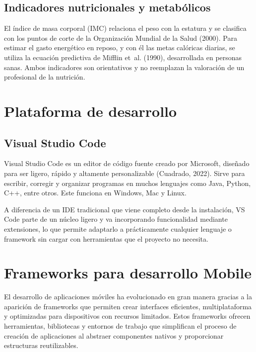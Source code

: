 \subsection{Indicadores nutricionales y metabólicos}
\label{subsec:nutricion}

El índice de masa corporal (IMC) relaciona el peso con la estatura y se clasifica
con los puntos de corte de la Organización Mundial de la Salud (2000). Para
estimar el gasto energético en reposo, y con él las metas calóricas diarias, se
utiliza la ecuación predictiva de Mifflin et~al. (1990), desarrollada en
personas sanas. Ambos indicadores son orientativos y no reemplazan la
valoración de un profesional de la nutrición.

\section{Plataforma de desarrollo}
\label{sec:plataforma}

\subsection{Visual Studio Code}

Visual Studio Code es un editor de código fuente creado por Microsoft,
diseñado para ser ligero, rápido y altamente personalizable (Cuadrado, 2022).
Sirve para escribir, corregir y organizar programas en muchos lenguajes como
Java, Python, C++, entre otros. Este funciona en Windows, Mac y Linux.

A diferencia de un IDE tradicional que viene completo desde la instalación, VS
Code parte de un núcleo ligero y va incorporando funcionalidad mediante
extensiones, lo que permite adaptarlo a prácticamente cualquier lenguaje o
framework sin cargar con herramientas que el proyecto no necesita.

\section{Frameworks para desarrollo Mobile}
\label{sec:frameworks}

El desarrollo de aplicaciones móviles ha evolucionado en gran manera gracias a
la aparición de frameworks que permiten crear interfaces eficientes,
multiplataforma y optimizadas para dispositivos con recursos limitados. Estos
frameworks ofrecen herramientas, bibliotecas y entornos de trabajo que
simplifican el proceso de creación de aplicaciones al abstraer componentes
nativos y proporcionar estructuras reutilizables.

